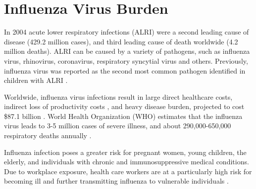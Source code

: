 \section{Influenza Virus Burden}

In 2004 acute lower respiratory infections (ALRI) were a second leading cause of disease (429.2 million cases), and third leading cause of death worldwide \cite{world2008global} (4.2 million deaths). ALRI can be caused by a variety of pathogens, such as influenza virus, rhinovirus, coronavirus, respiratory syncytial virus and others. Previously, influenza virus was reported as the second most common pathogen identified in children with ALRI \cite{nair2011global}.

Worldwide, influenza virus infections result in large direct healthcare costs, indirect loss of productivity costs \cite{de2015systematic}, and heavy disease burden, projected to cost \$87.1 billion \cite{molinari2007annual}. World Health Organization (WHO) estimates that the influenza virus leads to 3-5 million cases of severe illness, and about 290,000-650,000 respiratory deaths annually \cite{influenza_seasonal_2018}.

Influenza infection poses a greater risk for pregnant women, young children, the elderly, and individuals with chronic and immunosuppressive medical conditions. Due to workplace exposure, health care workers are at a particularly high risk for becoming ill and further transmitting influenza to vulnerable individuals \cite{influenza_seasonal_2018}.